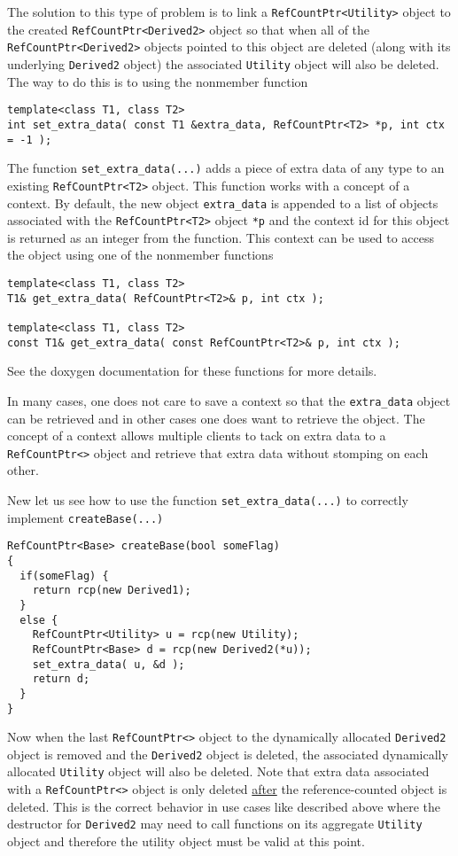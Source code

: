 The solution to this type of problem is to link a
{}\texttt{RefCountPtr<Utility>} object to the created
{}\texttt{RefCountPtr<Derived2>} object so that when all of the 
{}\texttt{RefCountPtr<Derived2>} objects pointed to this object are
deleted (along with its underlying {}\texttt{Derived2} object) the
associated {}\texttt{Utility} object will also be deleted.  The way to
do this is to using the nonmember function
%
{\scriptsize\begin{verbatim}
template<class T1, class T2>
int set_extra_data( const T1 &extra_data, RefCountPtr<T2> *p, int ctx = -1 );
\end{verbatim}}
%
The function {}\texttt{set\-\_extra\-\_data(...)} adds a piece of extra
data of any type to an existing {}\texttt{RefCountPtr<T2>} object.  This
function works with a concept of a context.  By default, the new
object {}\texttt{extra\-\_data} is appended to a list of objects
associated with the {}\texttt{RefCountPtr<T2>} object {}\texttt{*p} and
the context id for this object is returned as an integer from the function.
This context can be used to access the object using one of the nonmember
functions
%
{\scriptsize\begin{verbatim}
template<class T1, class T2>
T1& get_extra_data( RefCountPtr<T2>& p, int ctx );

template<class T1, class T2>
const T1& get_extra_data( const RefCountPtr<T2>& p, int ctx );
\end{verbatim}}
%
\noindent{}
See the doxygen documentation for these functions
for more details.

In many cases, one does not care to save a context so that the
{}\texttt{extra\-\_data} object can be retrieved and in other cases
one does want to retrieve the object.  The concept of a context allows
multiple clients to tack on extra data to a {}\texttt{RefCountPtr<>}
object and retrieve that extra data without stomping on each other.

New let us see how to use the function {}\texttt{set\-\_extra\-\_data(...)}
to correctly implement {}\texttt{create\-Base(...)}
%
{\scriptsize\begin{verbatim}
RefCountPtr<Base> createBase(bool someFlag)
{
  if(someFlag) {
    return rcp(new Derived1);
  }
  else {
    RefCountPtr<Utility> u = rcp(new Utility);
    RefCountPtr<Base> d = rcp(new Derived2(*u));
    set_extra_data( u, &d );
    return d;
  }
}
\end{verbatim}}
%
\noindent{}
Now when the last {}\texttt{RefCountPtr<>} object to the dynamically
allocated {}\texttt{Derived2} object is removed and the
{}\texttt{Derived2} object is deleted, the associated dynamically
allocated {}\texttt{Utility} object will also be deleted.  Note that
extra data associated with a {}\texttt{RefCountPtr<>} object is only
deleted \underline{after} the reference-counted object is deleted.
This is the correct behavior in use cases like described above where
the destructor for {}\texttt{Derived2} may need to call functions on its
aggregate {}\texttt{Utility} object and therefore the utility object
must be valid at this point.

